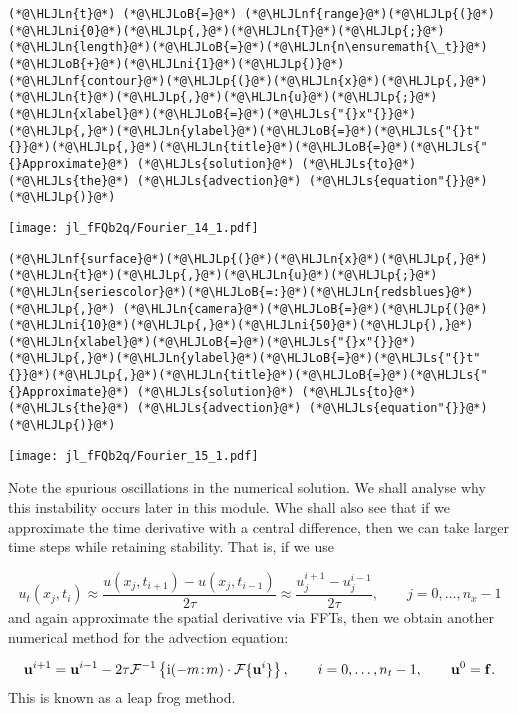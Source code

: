 \documentclass[12pt,a4paper]{article}
\newcommand{\HLJLn}[1]{#1}
\newcommand{\HLJLnf}[1]{\textcolor[RGB]{66,102,213}{#1}}
\newcommand{\HLJLs}[1]{\textcolor[RGB]{201,61,57}{#1}}
\newcommand{\HLJLni}[1]{\textcolor[RGB]{59,151,46}{#1}}
\newcommand{\HLJLoB}[1]{\textcolor[RGB]{102,102,102}{\textbf{#1}}}
\newcommand{\HLJLp}[1]{#1}
\begin{document}
\begin{lstlisting}
(*@\HLJLn{t}@*) (*@\HLJLoB{=}@*) (*@\HLJLnf{range}@*)(*@\HLJLp{(}@*)(*@\HLJLni{0}@*)(*@\HLJLp{,}@*)(*@\HLJLn{T}@*)(*@\HLJLp{;}@*)(*@\HLJLn{length}@*)(*@\HLJLoB{=}@*)(*@\HLJLn{n\ensuremath{\_t}}@*)(*@\HLJLoB{+}@*)(*@\HLJLni{1}@*)(*@\HLJLp{)}@*)
(*@\HLJLnf{contour}@*)(*@\HLJLp{(}@*)(*@\HLJLn{x}@*)(*@\HLJLp{,}@*)(*@\HLJLn{t}@*)(*@\HLJLp{,}@*)(*@\HLJLn{u}@*)(*@\HLJLp{;}@*)(*@\HLJLn{xlabel}@*)(*@\HLJLoB{=}@*)(*@\HLJLs{"{}x"{}}@*)(*@\HLJLp{,}@*)(*@\HLJLn{ylabel}@*)(*@\HLJLoB{=}@*)(*@\HLJLs{"{}t"{}}@*)(*@\HLJLp{,}@*)(*@\HLJLn{title}@*)(*@\HLJLoB{=}@*)(*@\HLJLs{"{}Approximate}@*) (*@\HLJLs{solution}@*) (*@\HLJLs{to}@*) (*@\HLJLs{the}@*) (*@\HLJLs{advection}@*) (*@\HLJLs{equation"{}}@*)(*@\HLJLp{)}@*)
\end{lstlisting}

\texttt{[image: jl\_fFQb2q/Fourier\_14\_1.pdf]}

\begin{lstlisting}
(*@\HLJLnf{surface}@*)(*@\HLJLp{(}@*)(*@\HLJLn{x}@*)(*@\HLJLp{,}@*)(*@\HLJLn{t}@*)(*@\HLJLp{,}@*)(*@\HLJLn{u}@*)(*@\HLJLp{;}@*)(*@\HLJLn{seriescolor}@*)(*@\HLJLoB{=:}@*)(*@\HLJLn{redsblues}@*)(*@\HLJLp{,}@*) (*@\HLJLn{camera}@*)(*@\HLJLoB{=}@*)(*@\HLJLp{(}@*)(*@\HLJLni{10}@*)(*@\HLJLp{,}@*)(*@\HLJLni{50}@*)(*@\HLJLp{),}@*)
(*@\HLJLn{xlabel}@*)(*@\HLJLoB{=}@*)(*@\HLJLs{"{}x"{}}@*)(*@\HLJLp{,}@*)(*@\HLJLn{ylabel}@*)(*@\HLJLoB{=}@*)(*@\HLJLs{"{}t"{}}@*)(*@\HLJLp{,}@*)(*@\HLJLn{title}@*)(*@\HLJLoB{=}@*)(*@\HLJLs{"{}Approximate}@*) (*@\HLJLs{solution}@*) (*@\HLJLs{to}@*) (*@\HLJLs{the}@*) (*@\HLJLs{advection}@*) (*@\HLJLs{equation"{}}@*)(*@\HLJLp{)}@*)
\end{lstlisting}

\texttt{[image: jl\_fFQb2q/Fourier\_15\_1.pdf]}

Note the spurious oscillations in the numerical solution.  We shall analyse why this instability occurs later in this module.  Whe shall also see that if we approximate the time derivative with a central difference, then we can take larger time steps while retaining stability. That is, if we use

\[
u_t(x_j,t_i) \approx \frac{u(x_j,t_{i+1}) - u(x_j,t_{i-1})}{2\tau} \approx \frac{u^{i+1}_j - u^{i-1}_j}{2\tau}, \qquad j = 0, \ldots, n_x-1
\]
and again approximate the spatial derivative via FFTs, then we obtain another numerical method for the advection equation:

\[
\mathbf{u}^{i+1} = \mathbf{u}^{i-1} - 2\tau \mathcal{F}^{-1}\left\lbrace {\rm i}(-m\!:\!m)\cdot\mathcal{F}\lbrace \mathbf{u}^{i} \rbrace\right\rbrace, \qquad i = 0, \ldots, n_t-1, \qquad \mathbf{u}^0 = \mathbf{f}.
\]
This is known as a leap frog method.
\end{document}
